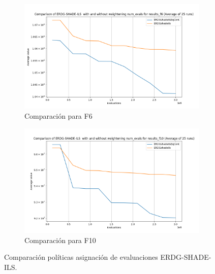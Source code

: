 \begin{figure}[h]
\centering
\begin{subfigure}{0.8\textwidth}
    \centering
    \includegraphics[width=\textwidth]{images/comparison_cont_f6.png} %
    \caption{Comparación para F6}
\end{subfigure}
\vspace{0.5cm} %
\begin{subfigure}{0.8\textwidth}
    \centering
    \includegraphics[width=\textwidth]{images/comparison_cont_f10.png} %
    \caption{Comparación para F10}
\end{subfigure}
\caption{Comparación políticas asignación de evaluaciones ERDG-SHADE-ILS.}
\label{fig:comparacion_erdg_shade_ils}
\end{figure}



\endinput
Comparar el algoritmo clásico con DG2 ERDG y H con CC
Comparar SHADE y SHADEILS con y sin ERDG en cada uno de los tipos